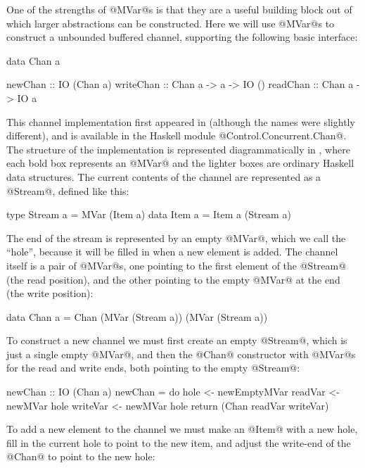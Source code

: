 
One of the strengths of @MVar@s is that they are a useful building
block out of which larger abstractions can be constructed.  Here we
will use @MVar@s to construct a unbounded buffered channel, supporting
the following basic interface:

\begin{haskell}
data Chan a

newChan   :: IO (Chan a)
writeChan :: Chan a -> a -> IO ()
readChan  :: Chan a -> IO a
\end{haskell}

\noindent This channel implementation first appeared in
\citet{jones96concurrent} (although the names were slightly
different), and is available in the Haskell module
@Control.Concurrent.Chan@.  The structure of the implementation is
represented diagrammatically in , where each bold box
represents an @MVar@ and the lighter boxes are ordinary Haskell data
structures.  The current contents of the channel are represented as a
@Stream@, defined like this:

\begin{haskell}
type Stream a = MVar (Item a)
data Item a   = Item a (Stream a)
\end{haskell}

\noindent The end of the stream is represented by an empty @MVar@,
which we call the ``hole'', because it will be filled in when a new
element is added.  The channel itself is a pair of @MVar@s, one
pointing to the first element of the @Stream@ (the read position), and
the other pointing to the empty @MVar@ at the end (the write
position):

\begin{haskell}
data Chan a
 = Chan (MVar (Stream a))
        (MVar (Stream a))
\end{haskell}

To construct a new channel we must first create an empty @Stream@, which
is just a single empty @MVar@, and then the @Chan@ constructor with
@MVar@s for the read and write ends, both pointing to the empty
@Stream@:

\begin{haskell}
newChan :: IO (Chan a)
newChan = do
   hole  <- newEmptyMVar
   readVar  <- newMVar hole
   writeVar <- newMVar hole
   return (Chan readVar writeVar)
\end{haskell}

To add a new element to the channel we must make an @Item@ with a new
hole, fill in the current hole to point to the new item, and adjust
the write-end of the @Chan@ to point to the new hole:


